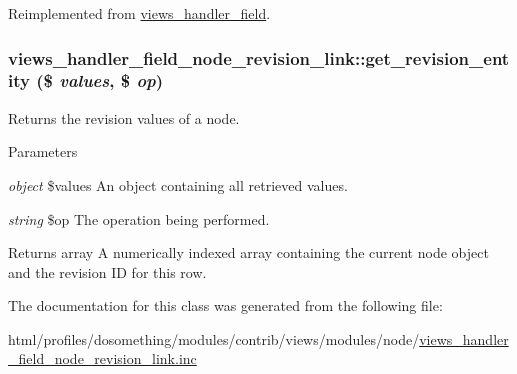 Reimplemented from \hyperlink{classviews__handler__field_a3d50050864c255b71c842972a45d39f6}{views\_\-handler\_\-field}.\hypertarget{classviews__handler__field__node__revision__link_a818745513ada7d807cfbd1c0f32e51b5}{
\subsubsection[{get\_\-revision\_\-entity}]{\setlength{\rightskip}{0pt plus 5cm}views\_\-handler\_\-field\_\-node\_\-revision\_\-link::get\_\-revision\_\-entity (\$ {\em values}, \/  \$ {\em op})}}
\label{classviews__handler__field__node__revision__link_a818745513ada7d807cfbd1c0f32e51b5}
Returns the revision values of a node.


\begin{DoxyParams}{Parameters}
\item[{\em object}]\$values An object containing all retrieved values. \item[{\em string}]\$op The operation being performed.\end{DoxyParams}
\begin{DoxyReturn}{Returns}
array A numerically indexed array containing the current node object and the revision ID for this row. 
\end{DoxyReturn}


The documentation for this class was generated from the following file:\begin{DoxyCompactItemize}
\item 
html/profiles/dosomething/modules/contrib/views/modules/node/\hyperlink{views__handler__field__node__revision__link_8inc}{views\_\-handler\_\-field\_\-node\_\-revision\_\-link.inc}\end{DoxyCompactItemize}
